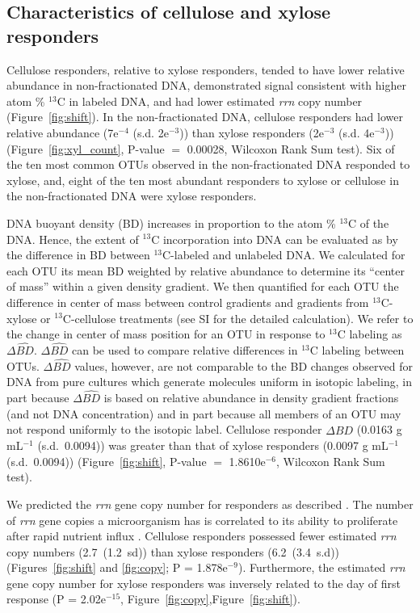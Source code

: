 \subsection{Characteristics of cellulose and xylose responders}
Cellulose responders, relative to xylose responders, tended to have lower
relative abundance in non-fractionated DNA, demonstrated signal consistent with
higher atom \% $^{13}$C in labeled DNA, and had lower estimated \textit{rrn}
copy number (Figure~\ref{fig:shift}). In the non-fractionated DNA, cellulose
responders had lower relative abundance (7e$^{-4}$ (s.d. 2e$^{-3}$)) than
xylose responders (2e$^{-3}$ (s.d. 4e$^{-3}$)) (Figure~\ref{fig:xyl_count},
P-value $=$ 0.00028, Wilcoxon Rank Sum test). Six of the ten most common OTUs
observed in the non-fractionated DNA responded to xylose, and, eight of the ten
most abundant responders to xylose or cellulose in the non-fractionated DNA
were xylose responders.

DNA buoyant density (BD) increases in proportion to the atom \% $^{13}$C of the
DNA. Hence, the extent of $^{13}$C incorporation into DNA can be evaluated as
by the difference in BD between $^{13}$C-labeled and unlabeled DNA. We
calculated for each OTU its mean BD weighted by relative abundance to determine
its “center of mass” within a given density gradient. We then quantified for
each OTU the difference in center of mass between control gradients and
gradients from $^{13}$C-xylose or $^{13}$C-cellulose treatments (see SI for the
detailed calculation). We refer to the change in center of mass position for an
OTU in response to $^{13}$C labeling as $\Delta\hat{BD}$. $\Delta\hat{BD}$ can
be used to compare relative differences in $^{13}$C labeling between OTUs.
$\Delta\hat{BD}$ values, however, are not comparable to the BD changes observed
for DNA from pure cultures which generate molecules uniform in isotopic
labeling, in part because $\Delta\hat{BD}$ is based on relative abundance in
density gradient fractions (and not DNA concentration) and in part because all
members of an OTU may not respond uniformly to the isotopic label. Cellulose
responder $\Delta\hat{BD}$ (0.0163 g mL$^{-1}$ (s.d.~0.0094)) was greater than
that of xylose responders (0.0097 g mL$^{-1}$ (s.d.~0.0094))
(Figure~\ref{fig:shift}, P-value $=$
1.8610e$^{-6}$, Wilcoxon Rank Sum test). 

We predicted the \textit{rrn} gene copy number for responders as described
\citep{Kembel_2012}. The number of \textit{rrn} gene copies a microorganism has
is correlated to its ability to proliferate after rapid 
nutrient influx \citep{Klappenbach_2000}. Cellulose responders possessed fewer
estimated \textit{rrn} copy numbers (2.7~(1.2~sd)) than xylose responders
(6.2~(3.4~s.d)) (Figures~\ref{fig:shift} and \ref{fig:copy};
P = 1.878e$^{-9}$). Furthermore, the estimated \textit{rrn} gene copy number
for xylose responders was inversely related to the day of first response (P
= 2.02e$^{-15}$, Figure~\ref{fig:copy},Figure~\ref{fig:shift}).

